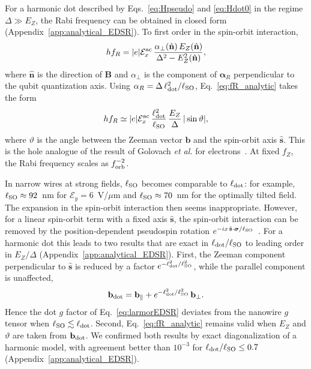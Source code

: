 \documentclass[
  aps,
  reprint,
  amsmath,
  amssymb,
  groupedaddress,
  floatfix,
  longbibliography,
]{revtex4-2}
\newcommand{\Eac}{\mathcal{E}^{\rm ac}_x}
\newcommand{\ldot}{\ell_{\rm dot}}
\newcommand{\lso}{\ell_{\rm SO}}
\newcommand{\nhat}{\hat{\mathbf n}}
\newcommand{\shat}{\hat{\mathbf s}}
\begin{document}
For a harmonic dot described by Eqs.~\eqref{eq:Hpseudo} and \eqref{eq:Hdot0} in the regime $\Delta\gg E_Z$, the Rabi frequency can be obtained in closed form (Appendix~\ref{app:analytical_EDSR}). To first order in the spin-orbit interaction,
\begin{align}
h f_R
=
|e|\Eac\,
\frac{
\alpha_\perp(\nhat)\,E_Z(\nhat)
}{
\Delta^2-E_Z^2(\nhat)
},
\label{eq:fR_analytic}
\end{align}
where $\nhat$ is the direction of $\mathbf{B}$ and $\alpha_\perp$ is the component of $\bm{\alpha}_R$ perpendicular to the qubit quantization axis. Using $\alpha_R=\Delta\,\ldot^2/\lso$, Eq.~\eqref{eq:fR_analytic} takes the form
\begin{align}
h f_R
\simeq
|e|\Eac\,\frac{\ldot^2}{\lso}\,\frac{E_Z}{\Delta}\,|\sin\vartheta|,
\label{eq:fR_lso}
\end{align}
where $\vartheta$ is the angle between the Zeeman vector $\mathbf{b}$ and the spin-orbit axis $\shat$. This is the hole analogue of the result of Golovach \emph{et al.} for electrons~\cite{golovach2006electric}. At fixed $f_Z$, the Rabi frequency scales as $f_{\rm orb}^{-2}$.

In narrow wires at strong fields, $\lso$ becomes comparable to $\ldot$: for example, $\lso\approx92$~nm for $\mathcal{E}_y=6$~V/$\mu$m and $\lso\approx70$~nm for the optimally tilted field. The expansion in the spin-orbit interaction then seems inappropriate. However, for a linear spin-orbit term with a fixed axis $\shat$, the spin-orbit interaction can be removed by the position-dependent pseudospin rotation $e^{-ix\,\shat\cdot\bm\sigma/\lso}$~\cite{flindt2006spin}. For a harmonic dot this leads to two results that are exact in $\ldot/\lso$ to leading order in $E_Z/\Delta$ (Appendix~\ref{app:analytical_EDSR}). First, the Zeeman component perpendicular to $\shat$ is reduced by a factor $e^{-\ldot^2/\lso^2}$, while the parallel component is unaffected,
\begin{align}
\mathbf{b}_{\rm dot}=\mathbf{b}_\parallel+e^{-\ldot^2/\lso^2}\,\mathbf{b}_\perp .
\label{eq:bdot}
\end{align}
Hence the dot $g$ factor of Eq.~\eqref{eq:larmorEDSR} deviates from the nanowire $g$ tensor when $\lso\lesssim\ldot$. Second, Eq.~\eqref{eq:fR_analytic} remains valid when $E_Z$ and $\vartheta$ are taken from $\mathbf{b}_{\rm dot}$. We confirmed both results by exact diagonalization of a harmonic model, with agreement better than $10^{-3}$ for $\ldot/\lso\le0.7$ (Appendix~\ref{app:analytical_EDSR}).
\end{document}
